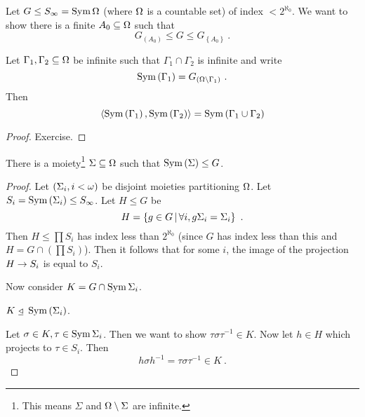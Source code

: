 \documentclass{amsart}
\begin{document}
\begin{Proof}
Let $G\leq S_\infty = \operatorname{Sym} \Omega$ (where $\Omega$ is a countable set) of index $< 2^{\aleph_0}$. 
We want to show there is a finite $A_0 \subseteq \Omega$ such that
\begin{equation}
G_{\left(A_0\right)} \leq G \leq G_{ \left\{A_0\right\}} \ .
\end{equation}
\begin{lem}
Let $\Gamma_1 , \Gamma_2 \subseteq \Omega$ be infinite such that $\Gamma_1 \cap \Gamma_2$ is
infinite and write
\begin{equation}
\operatorname{Sym}\left(\Gamma_1\right) = G_{\left(\Omega \setminus \Gamma_1\right)} \ .
\end{equation}
Then 
\begin{equation}
\left\langle \operatorname{Sym}\left(\Gamma_1\right) , \operatorname{Sym}\left(\Gamma_2\right) \right\rangle = \operatorname{Sym}\left(\Gamma_1 \cup
\Gamma_2\right)
\end{equation}
\end{lem}
\begin{proof}
Exercise.
\end{proof}
\begin{clm}
There is a moiety\footnote{This means $\Sigma$ and $\Omega\setminus \Sigma$ are infinite.}
$\Sigma\subseteq \Omega$ such that $\operatorname{Sym}\left(\Sigma\right)\leq G$.
\end{clm}
\begin{proof}
Let $\left(\Sigma_i , i < \omega\right)$ be disjoint moieties partitioning $\Omega$.
Let $S_i = \operatorname{Sym}\left(\Sigma_i\right)\leq S_\infty$. 
Let $H\leq G$ be
\begin{equation}
H = \left\{g\in G \, \middle\vert \, \forall i, g\Sigma_i = \Sigma_i\right\} \ .
\end{equation}
Then $H\leq \prod S_i$ has index less than $2^{\aleph_0}$ (since $G$ has
index less than this and $H = G\cap \left(\prod S_i\right)$). Then it follows that for
some $i$, the image of the projection $H\rightarrow S_i$ is equal to $S_i$.

Now consider $K = G\cap \operatorname{Sym} \Sigma_i$. 
\begin{clm}
$K\ \underline{\triangleleft}\  \operatorname{Sym}\left(\Sigma_i\right)$.
\end{clm}
Let $\sigma \in K, \tau\in \operatorname{Sym}\Sigma_i$. Then we want to show $\tau\sigma\tau^{-1}\in K$.
Now let $h\in H$ which projects to $\tau\in S_i$. Then 
\begin{equation}
h\sigma h^{-1} = \tau \sigma \tau^{-1} \in K \ .
\end{equation}


\end{proof}
\end{Proof}
\end{document}

